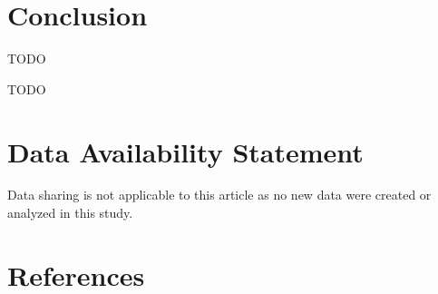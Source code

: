 \documentclass[aip, amsmath, amssymb, reprint,]{revtex4-1}
\begin{document}
\section{Conclusion}

TODO

\begin{acknowledgments}
  TODO
\end{acknowledgments}

\section*{Data Availability Statement}

Data sharing is not applicable to this article as no new data were created or analyzed in this study.

\section*{References}

\nocite{*}

\end{document}
